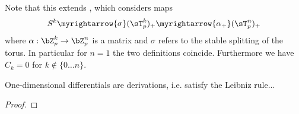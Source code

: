 \begin{defn}
        Note that this extends \cite[Definition 3.3]{carlsson2011higher}, which considers maps $$S^k \myrightarrow{\sigma} (\sT_p^k)_+ \myrightarrow{\alpha_+} (\sT_p^n)_+$$ where $\alpha:\bZ_p^k \to \bZ_p^n$ is a matrix and $\sigma$ refers to the stable splitting of the torus. In particular for $n=1$ the two definitions coincide.
        Furthermore we have $C_k = 0$ for $k \notin \{0 \ldots n\}$. %
      \end{defn}
      \begin{prop}\label{prop_diff_derivations}
        One-dimensional differentials are derivations, i.e. satisfy the Leibniz rule...
      \end{prop}
      \begin{proof}
      \end{proof}

